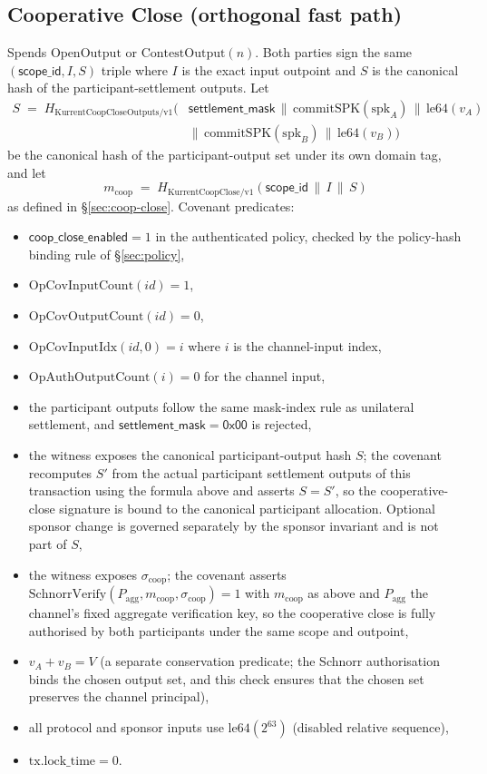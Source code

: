 \documentclass[10pt,a4paper]{article}
\begin{document}
\subsection{Cooperative Close (orthogonal fast path)}
Spends $\mathrm{OpenOutput}$ or $\mathrm{ContestOutput}(n)$. Both parties sign the same $(\mathsf{scope\_id}, I, S)$ triple where $I$ is the exact input outpoint and $S$ is the canonical hash of the participant-settlement outputs. Let
\[
  \begin{aligned}
  S \;=\; H_{\mathrm{KurrentCoopCloseOutputs/v1}}\bigl(&
  \mathsf{settlement\_mask} \,\|\, \mathrm{commitSPK}(\mathrm{spk}_A) \,\|\, \mathrm{le64}(v_A) \\
  & \|\, \mathrm{commitSPK}(\mathrm{spk}_B) \,\|\, \mathrm{le64}(v_B)\bigr)
  \end{aligned}
\]
be the canonical hash of the participant-output set under its own domain tag, and let
\[
  m_{\mathrm{coop}} \;=\; H_{\mathrm{KurrentCoopClose/v1}}(\mathsf{scope\_id} \,\|\, I \,\|\, S)
\]
as defined in \S\ref{sec:coop-close}. Covenant predicates:
\begin{itemize}
  \item $\mathsf{coop\_close\_enabled}=1$ in the authenticated policy, checked by the policy-hash binding rule of §\ref{sec:policy},
  \item $\mathrm{OpCovInputCount}(id) = 1$,
  \item $\mathrm{OpCovOutputCount}(id) = 0$,
  \item $\mathrm{OpCovInputIdx}(id, 0) = i$ where $i$ is the channel-input index,
  \item $\mathrm{OpAuthOutputCount}(i) = 0$ for the channel input,
  \item the participant outputs follow the same mask-index rule as unilateral settlement, and $\mathsf{settlement\_mask}=\mathsf{0x00}$ is rejected,
  \item the witness exposes the canonical participant-output hash $S$; the covenant recomputes $S'$ from the actual participant settlement outputs of this transaction using the formula above and asserts $S = S'$, so the cooperative-close signature is bound to the canonical participant allocation. Optional sponsor change is governed separately by the sponsor invariant and is not part of $S$,
  \item the witness exposes $\sigma_{\mathrm{coop}}$; the covenant asserts $\mathrm{SchnorrVerify}(P_{\mathrm{agg}}, m_{\mathrm{coop}}, \sigma_{\mathrm{coop}}) = 1$ with $m_{\mathrm{coop}}$ as above and $P_{\mathrm{agg}}$ the channel's fixed aggregate verification key, so the cooperative close is fully authorised by both participants under the same scope and outpoint,
  \item $v_A + v_B = V$ (a separate conservation predicate; the Schnorr authorisation binds the chosen output set, and this check ensures that the chosen set preserves the channel principal),
  \item all protocol and sponsor inputs use $\mathrm{le64}(2^{63})$ (disabled relative sequence),
  \item $\mathrm{tx.lock\_time} = 0$.
\end{itemize}
\end{document}
